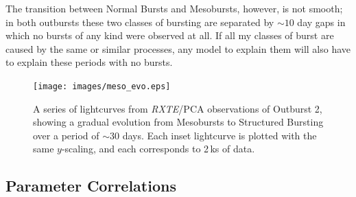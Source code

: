 \par The transition between Normal Bursts and Mesobursts, however, is not smooth; in both outbursts these two classes of bursting are separated by $\sim10$ day gaps in which no bursts of any kind were observed at all.  If all my classes of burst are caused by the same or similar processes, any model to explain them will also have to explain these periods with no bursts.

\begin{figure}
  \centering
  \texttt{[image: images/meso\_evo.eps]}
  \caption[A series of lightcurves from \textit{RXTE}/PCA observations of Outburst 2, showing a gradual evolution from Mesobursts to Structured Bursting over a period of $\sim30$ days.]{\small A series of lightcurves from \textit{RXTE}/PCA observations of Outburst 2, showing a gradual evolution from Mesobursts to Structured Bursting over a period of $\sim30$ days.  Each inset lightcurve is plotted with the same $y$-scaling, and each corresponds to 2\,ks of data.}
  \label{fig:meso_to_struc}
\end{figure}

\subsection{Parameter Correlations}

